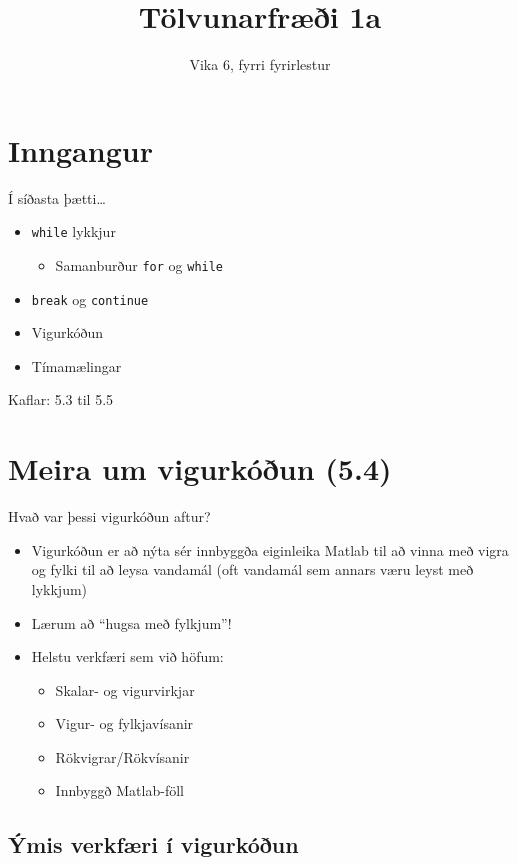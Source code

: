 \documentclass{beamer}
\title{Tölvunarfræði 1a}
\subtitle{Vika 6, fyrri fyrirlestur}
\begin{document}
\begin{frame}
\titlepage
\end{frame}

\section{Inngangur}

\begin{frame}{Í síðasta þætti\ldots}
\begin{itemize}
 \item \texttt{while} lykkjur
 \begin{itemize}
  \item Samanburður \texttt{for} og \texttt{while}
 \end{itemize}
 \item \texttt{break} og \texttt{continue}
 \item Vigurkóðun
 \item Tímamælingar
\end{itemize}
Kaflar: 5.3 til 5.5
\end{frame}

\section{Meira um vigurkóðun (5.4)}

\begin{frame}{Hvað var þessi vigurkóðun aftur?}
\begin{itemize}
 \item Vigurkóðun er að nýta sér innbyggða eiginleika Matlab til að vinna með vigra og fylki til að leysa vandamál (oft vandamál sem annars væru leyst með lykkjum)
 \item Lærum að ``hugsa með fylkjum''!
 \item Helstu verkfæri sem við höfum:
 \begin{itemize}
  \item Skalar- og vigurvirkjar
  \item Vigur- og fylkjavísanir
  \item Rökvigrar/Rökvísanir
  \item Innbyggð Matlab-föll
 \end{itemize}
\end{itemize}
\end{frame}

\subsection{Ýmis verkfæri í vigurkóðun}
\end{document}
